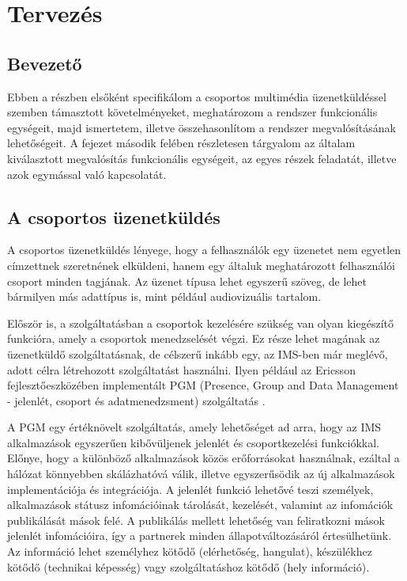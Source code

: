 \setcounter{tocdepth}{5}

\section{Tervezés}
\label{sec:tervezes}

\subsection{Bevezető}

Ebben a részben elsőként specifikálom a csoportos multimédia üzenetküldéssel szemben támasztott követelményeket, meghatározom a rendszer funkcionális egységeit, majd ismertetem, illetve összehasonlítom a rendszer megvalósításának lehetőségeit. A fejezet második felében részletesen tárgyalom az általam kiválasztott megvalósítás funkcionális egységeit, az egyes részek feladatát, illetve azok egymással való kapcsolatát.

\subsection{A csoportos üzenetküldés}
\label{sec:group_messaging}

A csoportos üzenetküldés lényege, hogy a felhasználók egy üzenetet nem egyetlen címzettnek szeretnének elküldeni, hanem egy általuk meghatározott felhasználói csoport minden tagjának. Az üzenet típusa lehet egyszerű szöveg, de lehet bármilyen más adattípus is, mint például audiovizuális tartalom. 

Először is, a szolgáltatásban a csoportok kezelésére szükség van olyan kiegészítő funkcióra, amely a csoportok menedzselését végzi. Ez része lehet magának az üzenetküldő szolgáltatásnak, de célszerű inkább egy, az IMS-ben már meglévő, adott célra létrehozott szolgáltatást használni. Ilyen például az Ericsson fejlesztőeszközében implementált PGM (Presence, Group and Data Management - jelenlét, csoport és adatmenedzsment) szolgáltatás \cite{ericsson_pgm}.

A PGM egy értéknövelt szolgáltatás, amely lehetőséget ad arra, hogy az IMS alkalmazások egyszerűen kibővüljenek jelenlét és csoportkezelési funkciókkal. Előnye, hogy a különböző alkalmazások közös erőforrásokat használnak, ezáltal a hálózat könnyebben skálázhatóvá válik, illetve egyszerűsödik az új alkalmazások implementációja és integrációja. A jelenlét funkció lehetővé teszi személyek, alkalmazások státusz infomációinak tárolását, kezelését, valamint az infomációk publikálását mások felé.
A publikálás mellett lehetőség van feliratkozni mások jelenlét infomációira, így a partnerek minden állapotváltozásáról értesülhetünk. Az információ lehet személyhez kötődő (elérhetőség, hangulat), készülékhez kötődő (technikai képesség) vagy szolgáltatáshoz kötődő (hely információ).

